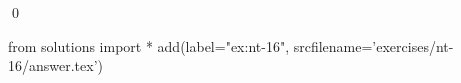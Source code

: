 
\begin{ex} 
  \label{ex:nt-16}
  
  \qed
\end{ex} 
\begin{python0}
from solutions import *
add(label="ex:nt-16",
    srcfilename='exercises/nt-16/answer.tex') 
\end{python0}
